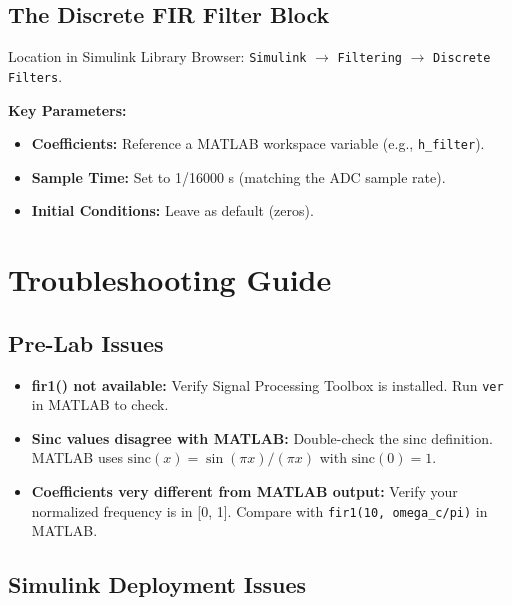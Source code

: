 \documentclass[11pt,letterpaper]{article}
\begin{document}
\subsection{The Discrete FIR Filter Block}

Location in Simulink Library Browser: \texttt{Simulink} $\to$ \texttt{Filtering} $\to$ \texttt{Discrete Filters}.

\noindent
\textbf{Key Parameters:}
\begin{itemize}
    \item \textbf{Coefficients:} Reference a MATLAB workspace variable (e.g., \texttt{h\_filter}).
    \item \textbf{Sample Time:} Set to 1/16000 s (matching the ADC sample rate).
    \item \textbf{Initial Conditions:} Leave as default (zeros).
\end{itemize}

\section{Troubleshooting Guide}

\subsection{Pre-Lab Issues}

\begin{itemize}
    \item \textbf{fir1() not available:} Verify Signal Processing Toolbox is installed. Run \texttt{ver} in MATLAB to check.
    \item \textbf{Sinc values disagree with MATLAB:} Double-check the sinc definition. MATLAB uses $\text{sinc}(x) = \sin(\pi x) / (\pi x)$ with $\text{sinc}(0) = 1$.
    \item \textbf{Coefficients very different from MATLAB output:} Verify your normalized frequency is in [0, 1]. Compare with \texttt{fir1(10, omega\_c/pi)} in MATLAB.
\end{itemize}

\subsection{Simulink Deployment Issues}
\end{document}
